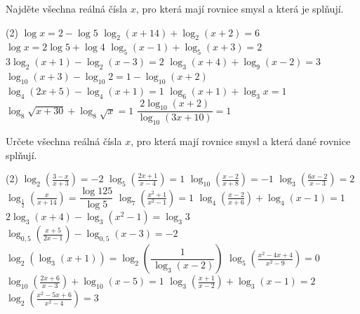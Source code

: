 \documentclass[12pt,a4paper]{article}
\begin{document}
\begin{exercise}
    Najděte všechna reálná čísla $x$, pro která mají rovnice smysl a která je splňují.
    \begin{tasks}(2)
        \task $\log x = 2 - \log 5$
        \task $\log_{2}(x+14) + \log_{2}(x+2) = 6$
        \task $\log x = 2\log 5 + \log 4$
        \task $\log_{5}(x-1) + \log_{5}(x+3) = 2$
        \task $3\log_{2}(x+1) - \log_{2}(x-3) = 2$
        \task $\log_{3}(x+4) + \log_{9}(x-2) = 3$  
        \task $\log_{10}(x+3) - \log_{10} 2 = 1 - \log_{10}(x+2)$
        \task $\log_{4}(2x+5) - \log_{4}(x+1) = 1$
        \task $\log_{6}(x+1) + \log_{3} x = 1$
        \task $\log_{8}\sqrt{x+30} + \log_{8}\sqrt{x} = 1$
        \task {}
        \task $\dfrac{2\log_{10}(x+2)}{\log_{10}(3x+10)} = 1$
        \task {}
    \end{tasks}
\end{exercise}


\begin{exercise}
    Určete všechna reálná čísla $x$, pro která mají rovnice smysl a která dané rovnice splňují.

    \begin{tasks}(2)
        \task $\log_{2}\!\left(\frac{3 - x}{x + 3}\right) = -2$
        \task $\log_{5}\!\left(\frac{2x + 1}{x - 4}\right) = 1$
        \task $\log_{10}\!\left(\frac{x - 2}{x + 8}\right) = -1$
        \task $\log_{3}\!\left(\frac{6x - 2}{x - 3}\right) = 2$
        \task $\log_{\frac12}\!\left(\frac{x}{x + 14}\right) = \dfrac{\log 125}{\log 5}$
        \task $\log_{7}\!\left(\frac{x^{2} + 1}{x^{2} - 1}\right) = 1$
        \task $\log_{4}\!\left(\frac{x-2}{x+6}\right) + \log_{4}(x-1) = 1$
        \task $2\log_{3}(x+4) - \log_{3}(x^{2}-1) = \log_{3} 3$
        \task $\log_{0{,}5}\!\left(\frac{x+5}{2x-1}\right) - \log_{0{,}5}(x-3) = -2$
        \task $\log_{2}\!\left(\log_{3}(x+1)\right) = \log_{2}\!\left(\dfrac{1}{\,\log_{3}(x-2)}\right)$
        \task $\log_{5}\!\left(\frac{x^{2} - 4x + 4}{x^{2} - 9}\right) = 0$
        \task $ \log_{10}\!\left(\frac{2x + 6}{x - 3}\right) + \log_{10}(x - 5) = 1$
        \task $\log_{3}\!\left(\frac{x + 1}{x - 2}\right) + \log_{3}(x - 1) = 2$
        \task $\log_{2}\!\left(\frac{x^{2} - 5x + 6}{x^{2} - 4}\right) = 3$
    \end{tasks}
\end{exercise}
\end{document}
